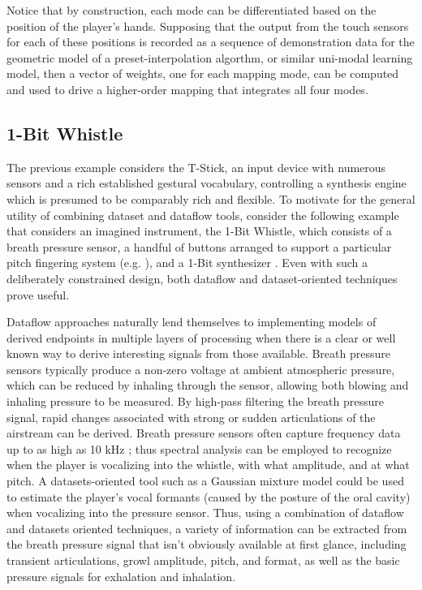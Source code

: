 \documentclass[main.tex]{subfiles}
\begin{document}
Notice that by construction, each mode can be differentiated based on the position
of the player's hands. Supposing that the output from the touch sensors for each
of these positions is recorded as a sequence of demonstration data for the
geometric model of a preset-interpolation algorthm, or similar uni-modal
learning model, then a vector of weights, one for each mapping mode, can be
computed and used to drive a higher-order mapping that integrates all four modes.

\subsection{1-Bit Whistle}

The previous example considers the T-Stick, an input device with numerous
sensors and a rich established gestural vocabulary, controlling a synthesis
engine which is presumed to be comparably rich and flexible. To motivate for
the general utility of combining dataset and dataflow tools, consider the
following example that considers an imagined instrument, the 1-Bit Whistle,
which consists of a breath pressure sensor, a handful of buttons arranged to
support a particular pitch fingering system (e.g. \cite{west2022nime_pfs}), and
a 1-Bit synthesizer \cite{troise2020thesis, troise2020_1-bit}. Even with such a deliberately constrained
design, both dataflow and dataset-oriented techniques prove useful.

Dataflow approaches naturally lend themselves to implementing models of derived
endpoints in multiple layers of processing when there is a clear or well known
way to derive interesting signals from those available. Breath pressure sensors
typically produce a non-zero voltage at ambient atmospheric pressure, which can
be reduced by inhaling through the sensor, allowing both blowing and inhaling
pressure to be measured. By high-pass filtering the breath pressure signal,
rapid changes associated with strong or sudden articulations of the airstream
can be derived. Breath pressure sensors often capture frequency data up to as
high as 10 kHz \cite{scavone2005nime_breath-pressure-frequency}; thus spectral analysis
can be employed to recognize when the player is vocalizing into the whistle,
with what amplitude, and at what pitch. A datasets-oriented tool such as a
Gaussian mixture model could be used to estimate the player's vocal formants
(caused by the posture of the oral cavity) when vocalizing into the pressure
sensor. Thus, using a combination of dataflow and datasets oriented techniques,
a variety of information can be extracted from the breath pressure signal that
isn't obviously available at first glance, including transient articulations,
growl amplitude, pitch, and format, as well as the basic pressure signals for
exhalation and inhalation.
\end{document}
